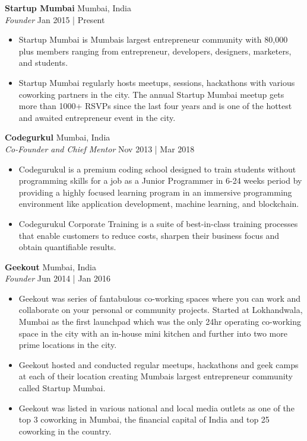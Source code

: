 \documentclass[a4paper]{article}
\begin{document}
\textbf{Startup Mumbai} \hfill Mumbai, India\\
\textit{Founder} \hfill Jan 2015 | Present\\
\vspace{-1mm}
\begin{itemize} \itemsep 1pt
	\item Startup Mumbai is Mumbai\textquotesingle{}s largest entrepreneur community with 80,000 plus members ranging from entrepreneur, developers, designers, marketers, and students.
	\item Startup Mumbai regularly hosts meetups, sessions, hackathons with various coworking partners in the city. The annual Startup Mumbai meetup gets more than 1000+ RSVPs since the last four years and is one of the hottest and awaited entrepreneur event in the city.
\end{itemize}
\textbf{Codegurkul} \hfill Mumbai, India\\
\textit{Co-Founder and Chief Mentor} \hfill Nov 2013 | Mar 2018\\
\vspace{-1mm}
\begin{itemize} \itemsep 1pt
	\item Codegurukul is a premium coding school designed to train students without programming skills for a job as a Junior Programmer in 6-24 weeks period by providing a highly focused learning program in an immersive programming environment like application development, machine learning, and blockchain.
	\item Codegurukul Corporate Training is a suite of best-in-class training processes that enable customers to reduce costs, sharpen their business focus and obtain quantifiable results.
\end{itemize}
\textbf{Geekout} \hfill Mumbai, India\\
\textit{Founder} \hfill Jun 2014 | Jan 2016\\
\vspace{-1mm}
\begin{itemize} \itemsep 1pt
	\item Geekout was series of fantabulous co-working spaces where you can work and collaborate on your personal or community projects. Started at Lokhandwala, Mumbai as the first launchpad which was the only 24hr operating co-working space in the city with an in-house mini kitchen and further into two more prime locations in the city.
	\item Geekout hosted and conducted regular meetups, hackathons and geek camps at each of their location creating Mumbai\textquotesingle{}s largest entrepreneur community called Startup Mumbai.
	\item Geekout was listed in various national and local media outlets as one of the top 3 coworking in Mumbai, the financial capital of India and top 25 coworking in the country.
\end{itemize}
\end{document}
